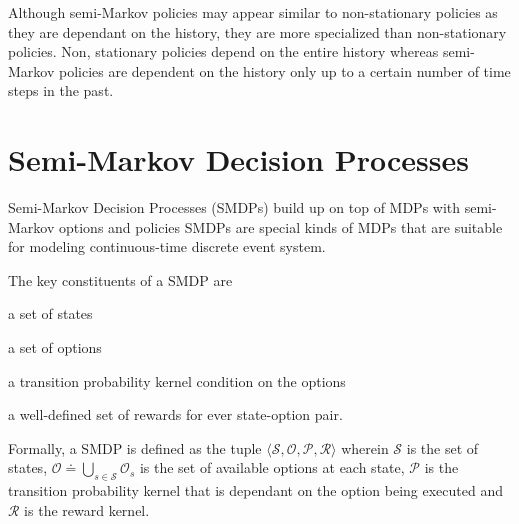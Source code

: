 Although semi-Markov policies may appear similar to non-stationary policies as they are dependant on the history, they are more specialized than non-stationary policies.
Non, stationary policies depend on the entire history whereas semi-Markov policies are dependent on the history only up to a certain number of time steps in the past.


\section{Semi-Markov Decision Processes}


Semi-Markov Decision Processes (SMDPs) build up on top of MDPs with semi-Markov options and policies
SMDPs are special kinds of MDPs that are suitable for modeling continuous-time discrete event system.

The key constituents of a SMDP are
\begin{inparaenum}[(a)]
    \item a set of states
    \item a set of options
    \item a transition probability kernel condition on the options
    \item a well-defined set of rewards for ever state-option pair.
\end{inparaenum}

Formally, a SMDP is defined as the tuple $\langle \mathcal{S}, \mathcal{O}, \mathcal{P}, \mathcal{R} \rangle$ wherein $\mathcal{S}$ is the set of states, $\mathcal{O} \doteq \bigcup_{s \in \mathcal{S}} \mathcal{O}_s$ is the set of available options at each state, $\mathcal{P}$ is the transition probability kernel that is dependant on the option being executed and $\mathcal{R}$ is the reward kernel.